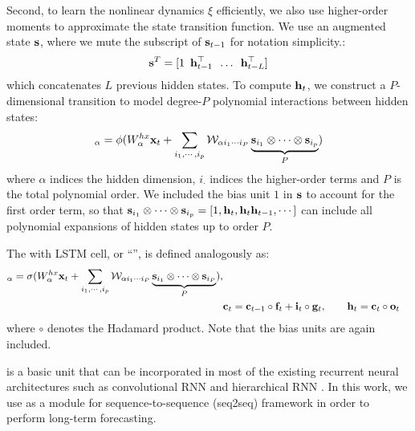 Second, to learn the nonlinear dynamics $\xi$ efficiently, we also use higher-order moments to approximate the state transition function.
%
We use an augmented state ${\mathbf{s}}$, where we mute the subscript of ${\mathbf{s}}_{t-1}$ for notation simplicity.:
\begin{equation}
	{\mathbf{s}}^T = [1 \hspace{5pt} {\mathbf{h}}_{t-1}^\top \hspace{5pt} \ldots \hspace{5pt} {\mathbf{h}}_{t-L}^\top ]
\end{equation}
which concatenates $L$ previous hidden states.
% 
To compute ${\mathbf{h}}_t$, we construct a $P$-dimensional transition  to model degree-$P$ polynomial interactions between hidden states:
%
\begin{align}
[\V{h}_{t}]_\alpha = \phi(W^{hx}_\alpha\V{x}_t+  
    \sum_{i_1,\cdots, i_p}\T{W}_{\alpha i_1 \cdots i_{P}}  \underbrace{\V{s}_{i_1} \otimes\cdots\otimes \V{s}_{i_p} }_{P} )\nonumber
%
\label{eqn:tensor_rnn}
\end{align}
%
where $\alpha$ indices the hidden dimension, $i_\cdot$ indices the higher-order terms and $P$ is the total  polynomial order. We included the bias unit $1$ in ${\mathbf{s}}$ to account for the first order term, so that  ${\mathbf{s}}_{i_1} \otimes\cdots\otimes {\mathbf{s}}_{i_p} = [1, {\mathbf{h}}_t, {\mathbf{h}}_t{\mathbf{h}}_{t-1},\cdots]$ can include all  polynomial expansions of hidden states up to order $P$. 

%
%
%
The \trnn{} with LSTM cell, or ``\tlstm{}'', is defined analogously as:
\begin{align}
[\V{i}_t, \V{g}_t, &\V{f}_t, \V{o}_t]_\alpha = \sigma (W^{hx}_\alpha \V{x}_t + \sum_{i_1,\cdots, i_p}\T{W}_{\alpha i_1 \cdots i_{P}}  \underbrace{\V{s}_{i_1} \otimes\cdots\otimes \V{s}_{i_P} }_{P} ), \\
%
& \V{c}_t = \V{c}_{t-1} \circ \V{f}_t +  \V{i}_t\circ \V{g}_t,
%
\qquad
%
\V{h}_t = \V{c}_t \circ \V{o}_t \nonumber
%
\end{align}
%
where $\circ$ denotes the Hadamard product. Note that the bias units are again included.

 \trnn{} is a basic  unit that can be incorporated in most of the existing recurrent neural architectures such as convolutional RNN \citep{xingjian2015convolutional} and hierarchical RNN \citep{chung2016hierarchical}. In this work, we use  \trnn{} as a module for sequence-to-sequence (seq2seq) framework \citep{sutskever2014sequence} in order to perform long-term forecasting.



